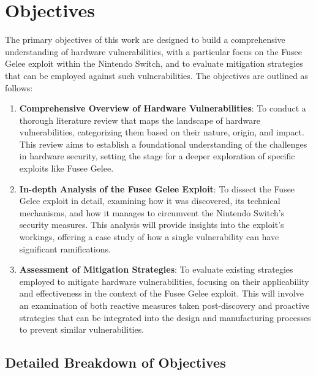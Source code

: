 \hypertarget{objectives}{%
\section{Objectives}\label{objectives}}

The primary objectives of this work are designed to build a
comprehensive understanding of hardware vulnerabilities, with a
particular focus on the Fusee Gelee exploit within the Nintendo Switch,
and to evaluate mitigation strategies that can be employed against such
vulnerabilities. The objectives are outlined as follows:

\begin{enumerate}
\def\labelenumi{\arabic{enumi}.}
\item
  \textbf{Comprehensive Overview of Hardware Vulnerabilities}: To
  conduct a thorough literature review that maps the landscape of
  hardware vulnerabilities, categorizing them based on their nature,
  origin, and impact. This review aims to establish a foundational
  understanding of the challenges in hardware security, setting the
  stage for a deeper exploration of specific exploits like Fusee Gelee.
\item
  \textbf{In-depth Analysis of the Fusee Gelee Exploit}: To dissect the
  Fusee Gelee exploit in detail, examining how it was discovered, its
  technical mechanisms, and how it manages to circumvent the Nintendo
  Switch's security measures. This analysis will provide insights into
  the exploit's workings, offering a case study of how a single
  vulnerability can have significant ramifications.
\item
  \textbf{Assessment of Mitigation Strategies}: To evaluate existing
  strategies employed to mitigate hardware vulnerabilities, focusing on
  their applicability and effectiveness in the context of the Fusee
  Gelee exploit. This will involve an examination of both reactive
  measures taken post-discovery and proactive strategies that can be
  integrated into the design and manufacturing processes to prevent
  similar vulnerabilities.
\end{enumerate}

\hypertarget{detailed-breakdown-of-objectives}{%
\subsection{Detailed Breakdown of
Objectives}\label{detailed-breakdown-of-objectives}}

